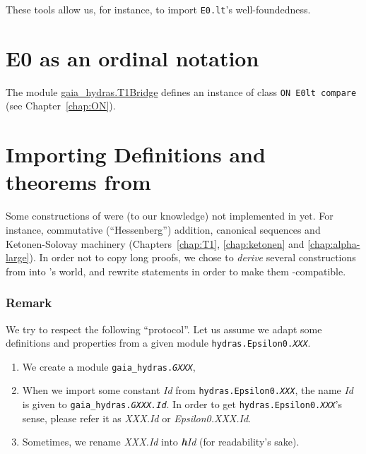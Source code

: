 
These tools allow us, for instance,  to import \texttt{E0.lt}'s  well-foundedness.


\section{E0 as an ordinal notation}
The module \href{../theories/html/gaia_hydras.T1Bridge.html}{gaia\_hydras.T1Bridge} defines an instance of class \texttt{ON E0lt compare}
(see Chapter~\ref{chap:ON}).







\section{Importing Definitions and theorems from \HydrasLib}

Some constructions of \HydrasLib were (to our knowledge) not implemented in \gaia yet. For instance, commutative (``Hessenberg'') addition, canonical sequences and Ketonen-Solovay machinery (Chapters~\ref{chap:T1}, \ref{chap:ketonen} and \ref{chap:alpha-large}). In order not to copy long proofs, we chose to
\emph{derive} several constructions from \HydrasLib into \gaia's world, and rewrite \HydrasLib statements in order to make them \gaia-compatible.


\subsubsection{Remark}
\label{sect:gaia-masking}
We try to respect the following ``protocol''.
Let us assume we adapt some definitions and properties
from a given module \texttt{hydras.Epsilon0.{\it XXX}}.
\begin{enumerate}
\item We create a module \texttt{gaia\_hydras.{\it GXXX}},
\item When we import some constant \emph{Id} from
 \texttt{hydras.Epsilon0.{\it XXX}}, the name 
\emph{Id} is given to \texttt{gaia\_hydras.{\it GXXX.Id}}.
In order to get
\texttt{hydras.Epsilon0.{\it XXX}}'s sense, please refer it as
  \emph{XXX.Id} or \emph{Epsilon0.XXX.Id}.
  \item Sometimes, we rename \emph{XXX.Id} into \emph{{\bf h}Id} (for readability's sake).
\end{enumerate}

